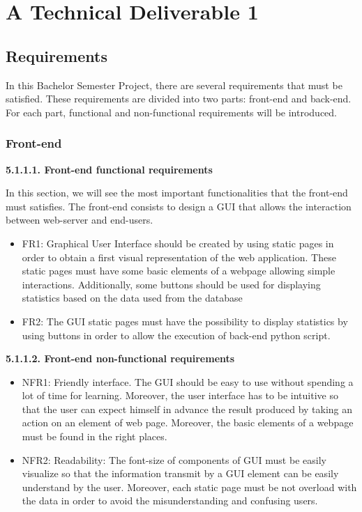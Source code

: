 \documentclass[conference,compsoc]{IEEEtran}
\begin{document}
\section{ A Technical Deliverable 1}

\label{sec-production}
\subsection{Requirements}
In this Bachelor Semester Project, there are several requirements that must be satisfied. These requirements are divided into two parts: front-end and back-end. For each part, functional and non-functional requirements will be introduced. 
\subsubsection{Front-end}
\noindent
\newline\newline
\textbf{5.1.1.1. Front-end functional requirements}
\newline

In this section, we will see the most important functionalities that the front-end must satisfies. The front-end consists to design a GUI that allows the interaction between web-server and end-users. 
\begin{itemize}
	\item FR1: Graphical User Interface should be created by using static pages in order to obtain a first visual representation of the web application. These static pages must have some basic elements of a webpage allowing simple interactions. Additionally, some buttons should be used for displaying statistics based on the data used from the database

\item FR2: The GUI static pages must have the possibility to display statistics by using buttons in order to allow the execution of back-end python script. 
\end{itemize}
	
\noindent
\newline\newline
\textbf{5.1.1.2. Front-end non-functional requirements}
\newline

\begin{itemize}
\item NFR1: Friendly interface. The GUI should be easy to use without spending a lot of time for learning. Moreover, the user interface has to be intuitive so that the user can expect himself in advance the result produced by taking an action on an element of web page. Moreover, the basic elements of a webpage must be found in the right places. 
\newline
\item NFR2: Readability: The font-size of components of GUI must be easily visualize so that the information transmit by a GUI element can be easily understand by the user. Moreover, each static page must be not overload with the data in order to avoid the misunderstanding and confusing users. 
\end{itemize}
\end{document}
